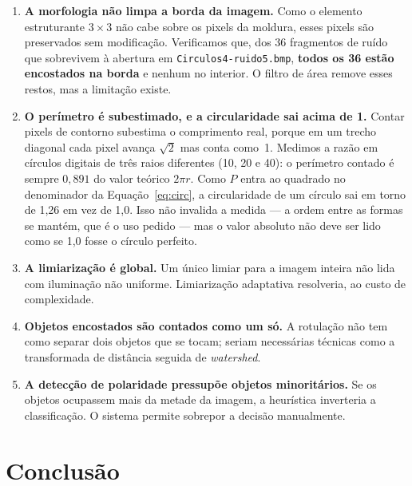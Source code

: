 \documentclass[12pt,a4paper]{article}
\begin{document}
\begin{enumerate}
  \item \textbf{A morfologia não limpa a borda da imagem.} Como o elemento
    estruturante $3\times3$ não cabe sobre os pixels da moldura, esses pixels
    são preservados sem modificação. Verificamos que, dos 36 fragmentos de
    ruído que sobrevivem à abertura em \texttt{Circulos4-ruido5.bmp},
    \textbf{todos os 36 estão encostados na borda} e nenhum no interior. O
    filtro de área remove esses restos, mas a limitação existe.

  \item \textbf{O perímetro é subestimado, e a circularidade sai acima de
    1.} Contar pixels de contorno subestima o comprimento real, porque em um
    trecho diagonal cada pixel avança $\sqrt{2}$ mas conta como~1. Medimos a
    razão em círculos digitais de três raios diferentes (10, 20 e 40): o
    perímetro contado é sempre $0{,}891$ do valor teórico $2\pi r$. Como $P$
    entra ao quadrado no denominador da Equação~\ref{eq:circ}, a circularidade
    de um círculo sai em torno de 1,26 em vez de 1,0. Isso não invalida a
    medida --- a ordem entre as formas se mantém, que é o uso pedido --- mas o
    valor absoluto não deve ser lido como se 1,0 fosse o círculo perfeito.

  \item \textbf{A limiarização é global.} Um único limiar para a imagem
    inteira não lida com iluminação não uniforme. Limiarização adaptativa
    resolveria, ao custo de complexidade.

  \item \textbf{Objetos encostados são contados como um só.} A rotulação não
    tem como separar dois objetos que se tocam; seriam necessárias técnicas
    como a transformada de distância seguida de \emph{watershed}.

  \item \textbf{A detecção de polaridade pressupõe objetos minoritários.} Se
    os objetos ocupassem mais da metade da imagem, a heurística inverteria a
    classificação. O sistema permite sobrepor a decisão manualmente.
\end{enumerate}

\section{Conclusão}
\end{document}
